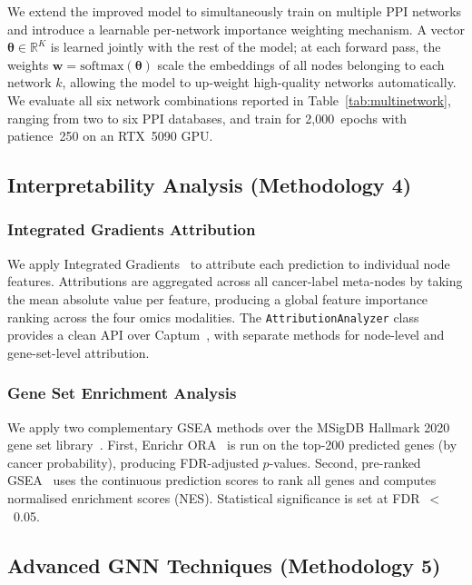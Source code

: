 We extend the improved model to simultaneously train on multiple PPI networks and introduce
a learnable per-network importance weighting mechanism. A vector
$\boldsymbol{\theta} \in \mathbb{R}^{K}$ is learned jointly with the rest of the model;
at each forward pass, the weights $\mathbf{w} = \text{softmax}(\boldsymbol{\theta})$ scale
the embeddings of all nodes belonging to each network $k$, allowing the model to
up-weight high-quality networks automatically. We evaluate all six network combinations
reported in Table~\ref{tab:multinetwork}, ranging from two to six PPI databases, and train
for 2,000~epochs with patience~250 on an RTX~5090 GPU.

\subsection{Interpretability Analysis (Methodology 4)}

\subsubsection{Integrated Gradients Attribution}
We apply Integrated Gradients~\cite{ig2017} to attribute each prediction to individual
node features. Attributions are aggregated across all cancer-label meta-nodes by taking
the mean absolute value per feature, producing a global feature importance ranking across
the four omics modalities. The \texttt{AttributionAnalyzer} class provides a clean API
over Captum~\cite{captum2020}, with separate methods for node-level and gene-set-level
attribution.

\subsubsection{Gene Set Enrichment Analysis}
We apply two complementary GSEA methods over the MSigDB Hallmark 2020 gene set
library~\cite{msigdb2015}. First, Enrichr ORA~\cite{enrichr2013} is run on the top-200
predicted genes (by cancer probability), producing FDR-adjusted $p$-values. Second,
pre-ranked GSEA~\cite{gsea2005} uses the continuous prediction scores to rank all genes
and computes normalised enrichment scores (NES). Statistical significance is set at
FDR~$<$~0.05.

\subsection{Advanced GNN Techniques (Methodology 5)}
\label{sec:m5}

